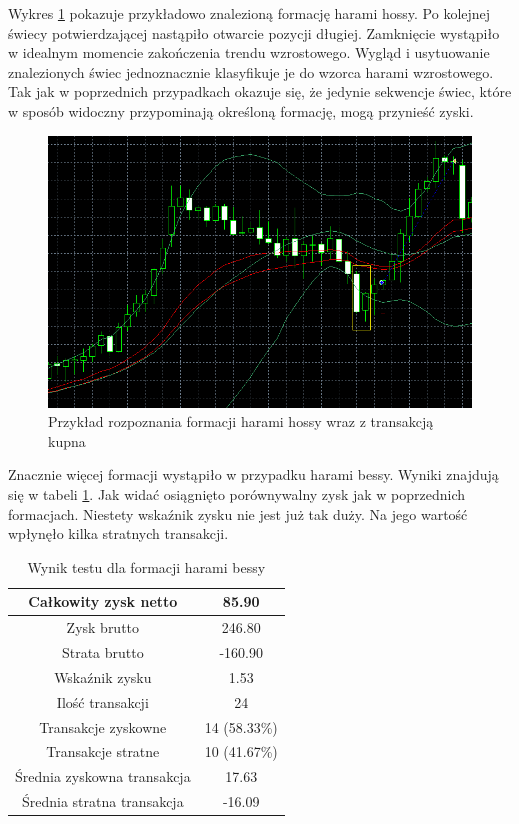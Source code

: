 \documentclass[pdflatex,11pt]{aghdpl}
\begin{document}
Wykres \ref{przyklad_harami_hossy} pokazuje przykładowo znalezioną formację harami hossy. Po kolejnej świecy potwierdzającej nastąpiło otwarcie pozycji długiej. Zamknięcie wystąpiło w idealnym momencie zakończenia trendu wzrostowego. Wygląd i usytuowanie znalezionych świec jednoznacznie klasyfikuje je do wzorca harami wzrostowego. Tak jak w poprzednich przypadkach okazuje się, że jedynie sekwencje świec, które w sposób widoczny przypominają określoną formację, mogą przynieść zyski. 
\begin{figure}[h!]
\begin{center}
\includegraphics[width=14cm]{bullishharami/przyklad.png}
\caption{Przykład rozpoznania formacji harami hossy wraz z transakcją kupna}
\label{przyklad_harami_hossy}
\end{center}
\end{figure} 
Znacznie więcej formacji wystąpiło w przypadku harami bessy. Wyniki znajdują się w tabeli \ref{raport_harami_bessy}. Jak widać osiągnięto porównywalny zysk jak w poprzednich formacjach. Niestety wskaźnik zysku nie jest już tak duży. Na jego wartość wpłynęło kilka stratnych transakcji. 
\begin{table}[h!]
\caption{Wynik testu dla formacji harami bessy}
\begin{center}
\begin{tabular}{|c|c|}
\hline 
Całkowity zysk netto & 85.90\\
\hline
Zysk brutto & 246.80 \\
\hline
Strata brutto & -160.90 \\
\hline
Wskaźnik zysku & 1.53 \\
\hline
\hline
Ilość transakcji & 24 \\
\hline
Transakcje zyskowne & 14 (58.33\%) \\
\hline
Transakcje stratne & 10 (41.67\%) \\
\hline
\hline
Średnia zyskowna transakcja & 17.63 \\
\hline
Średnia stratna transakcja & -16.09 \\
\hline
\end{tabular} 
\label{raport_harami_bessy}
\end{center}
\end{table}
\end{document}
